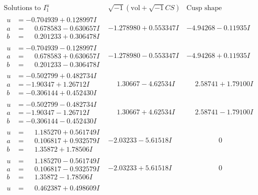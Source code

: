 \documentclass[1p]{elsarticle_modified}
\theoremstyle{definition}
\newcommand{\I}{\sqrt{-1}}
\begin{document}
$$\begin{array}{c|c|c}
\text{Solutions to }I^u_{1}& \I (\text{vol} + \sqrt{-1}CS) & \text{Cusp shape}\\
 \hline 
\begin{aligned}
u &= -0.704939 + 0.128997 I \\
a &= \phantom{-}0.678583 - 0.630657 I \\
b &= \phantom{-}0.201233 + 0.306478 I\end{aligned}
 & -1.278980 + 0.553347 I & -4.94268 - 0.11935 I \\ \hline\begin{aligned}
u &= -0.704939 - 0.128997 I \\
a &= \phantom{-}0.678583 + 0.630657 I \\
b &= \phantom{-}0.201233 - 0.306478 I\end{aligned}
 & -1.278980 - 0.553347 I & -4.94268 + 0.11935 I \\ \hline\begin{aligned}
u &= -0.502799 + 0.482734 I \\
a &= -1.90347 + 1.26712 I \\
b &= -0.306144 + 0.452430 I\end{aligned}
 & \phantom{-}1.30667 - 4.62534 I & \phantom{-}2.58741 + 1.79100 I \\ \hline\begin{aligned}
u &= -0.502799 - 0.482734 I \\
a &= -1.90347 - 1.26712 I \\
b &= -0.306144 - 0.452430 I\end{aligned}
 & \phantom{-}1.30667 + 4.62534 I & \phantom{-}2.58741 - 1.79100 I \\ \hline\begin{aligned}
u &= \phantom{-}1.185270 + 0.561749 I \\
a &= \phantom{-}0.106817 + 0.932579 I \\
b &= \phantom{-}1.35872 + 1.78506 I\end{aligned}
 & -2.03233 - 5.61518 I & \phantom{-0.000000 } 0 \\ \hline\begin{aligned}
u &= \phantom{-}1.185270 - 0.561749 I \\
a &= \phantom{-}0.106817 - 0.932579 I \\
b &= \phantom{-}1.35872 - 1.78506 I\end{aligned}
 & -2.03233 + 5.61518 I & \phantom{-0.000000 } 0 \\ \hline\begin{aligned}
u &= \phantom{-}0.462387 + 0.498609 I \\

\end{aligned}
\end{array}$$
\end{document}
